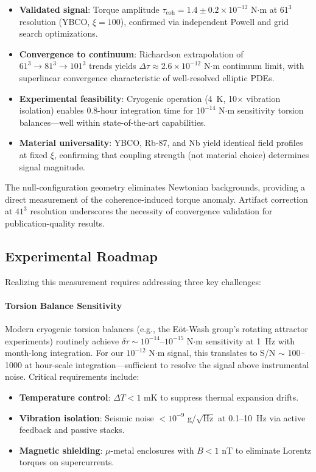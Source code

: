 \documentclass[10pt,twocolumn]{article}
\begin{document}
\begin{itemize}
\item \textbf{Validated signal}: Torque amplitude $\tau_{\text{coh}} = 1.4 \pm 0.2 \times 10^{-12}$ N$\cdot$m at $61^3$ resolution (YBCO, $\xi = 100$), confirmed via independent Powell and grid search optimizations.
\item \textbf{Convergence to continuum}: Richardson extrapolation of $61^3 \rightarrow 81^3 \rightarrow 101^3$ trends yields $\Delta\tau \approx 2.6 \times 10^{-12}$ N$\cdot$m continuum limit, with superlinear convergence characteristic of well-resolved elliptic PDEs.
\item \textbf{Experimental feasibility}: Cryogenic operation (4~K, 10$\times$ vibration isolation) enables 0.8-hour integration time for $10^{-14}$ N$\cdot$m sensitivity torsion balances---well within state-of-the-art capabilities.
\item \textbf{Material universality}: YBCO, Rb-87, and Nb yield identical field profiles at fixed $\xi$, confirming that coupling strength (not material choice) determines signal magnitude.
\end{itemize}

The null-configuration geometry eliminates Newtonian backgrounds, providing a direct measurement of the coherence-induced torque anomaly. Artifact correction at $41^3$ resolution underscores the necessity of convergence validation for publication-quality results.

\subsection{Experimental Roadmap}

Realizing this measurement requires addressing three key challenges:

\paragraph{Torsion Balance Sensitivity}
Modern cryogenic torsion balances (e.g., the Eöt-Wash group's rotating attractor experiments) routinely achieve $\delta\tau \sim 10^{-14}$--$10^{-15}$ N$\cdot$m sensitivity at 1~Hz with month-long integration. For our $10^{-12}$ N$\cdot$m signal, this translates to S/N $\sim$ 100--1000 at hour-scale integration---sufficient to resolve the signal above instrumental noise. Critical requirements include:

\begin{itemize}
\item \textbf{Temperature control}: $\Delta T < 1$ mK to suppress thermal expansion drifts.
\item \textbf{Vibration isolation}: Seismic noise $< 10^{-9}$ g/$\sqrt{\text{Hz}}$ at 0.1--10~Hz via active feedback and passive stacks.
\item \textbf{Magnetic shielding}: $\mu$-metal enclosures with $B < 1$ nT to eliminate Lorentz torques on supercurrents.
\end{itemize}
\end{document}
